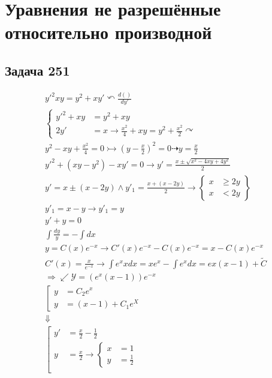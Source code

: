 \chapter{Уравнения не разрешённые относительно производной}
\section{Задача 251}

\begin{gather}
  y'^2xy=y^2+xy'\curvearrowleft \frac{d()}{dy'}\\
  \left\{ \begin{aligned}
     y'^2+xy&=y^2+xy   \\
    2y' & =x \rightarrow \frac{x^2}{4}+xy=y^2+\frac{x^2}{2} \curvearrowright 
  \end{aligned} \right.\\
  y^2-xy+\frac{x^2}{4}=0\rightarrowtail (y-\frac{x}{2})^2=0\dashrightarrow \boxed{y=\frac{x}{2}}\\
  y'^2+(xy-y^2)-xy'=0\to y'=\frac{x\pm \sqrt{x^2-4xy+4y^2}}{2}\\
  y'=x\pm(x-2y) \land   y'_1=\frac{x+(x-2y)}{2}\to \left\{
    \begin{aligned}
        x &\geqslant  2y \\
        x &< 2y
    \end{aligned}
\right\}\\
y'_1=x-y\to y'_1=y\\
y'+y=0\\
\int \frac{dy}{y}=-\int dx\\
y=C(x)e^{-x}\longrightarrow C'(x)e^{-x}-C(x)e^{-x}=x-C(x)e^{-x}\\
C'(x)=\frac{x}{e^{-x}}\longrightarrow \int e^xxdx=xe^x-\int e^xdx=ex(x-1)+\widetilde{C}\\
\Longrightarrow \swarrow \boxed{\mathcal{Y} =(e^x(x-1))e^{-x}}\\
\left[
    \begin{aligned}
        y&=C_2e^x \\
        y&=(x-1)+C_1e^X
    \end{aligned}    
\right.\\
\Downarrow \\
\left[
    \begin{aligned}
        y'&=\frac{x}{2}-\frac{1}{2} \\
        y&=\frac{x}{2}\to \left\{ \begin{aligned}
          x&=1\\
          y&= \frac{1}{2}
        \end{aligned} \right. \\
    \end{aligned}    
\right.
\end{gather}

